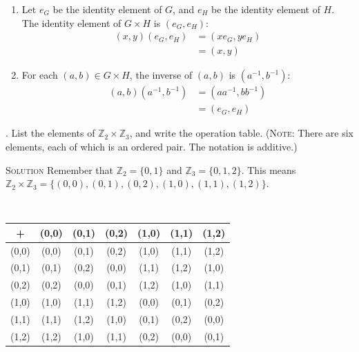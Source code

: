\documentclass[twoside]{amsart}
\newcommand{\Solution}{\textsc{Solution}\xspace}
\begin{document}
\begin{enumerate}[A.]
\begin{enumerate}[(a)]
\begin{enumerate}[(G1)]
	 \item Let $e_G$ be the identity element of $G$, and $e_H$
	 be the identity element of $H$. The identity element of
	 $G \times H$ is $(e_G,e_H)$:
	 \begin{align*}
	    (x,y)(e_G,e_H) & = (xe_G,ye_H)  \\
	                   & = (x,y)
	 \end{align*}

	 \item For each $(a,b)\in G \times H$, the inverse of $(a,b)$
	 is $(a^{-1},b^{-1})$:
	 \begin{align*}
	    (a,b)(a^{-1},b^{-1}) & = (aa^{-1},bb^{-1}) \\
	                         & = (e_G,e_H)
	 \end{align*}
      \end{enumerate}

      . List the elements of $\mathbb{Z}_2 \times \mathbb{Z}_3$,
      and write the operation table. (\textsc{Note}: There are six
      elements, each of which is an ordered pair. The notation is additive.)
      
      \Solution Remember that $\mathbb{Z}_2 = \{0,1\}$ and $\mathbb{Z}_3 =
      \{0,1,2\}$. This means $\mathbb{Z}_2 \times \mathbb{Z}_3 =
      \{(0,0), (0,1), (0,2), (1,0), (1,1), (1,2)\}$.

      \tiny \begin{verbatim}
      
      \end{verbatim}\normalsize
      \begin{center}
      \begin{tabular}{c|cccccc}
        +   & (0,0) & (0,1) & (0,2) & (1,0) & (1,1) & (1,2) \\ \hline
      (0,0) & (0,0) & (0,1) & (0,2) & (1,0) & (1,1) & (1,2) \\
      (0,1) & (0,1) & (0,2) & (0,0) & (1,1) & (1,2) & (1,0) \\
      (0,2) & (0,2) & (0,0) & (0,1) & (1,2) & (1,0) & (1,1) \\
      (1,0) & (1,0) & (1,1) & (1,2) & (0,0) & (0,1) & (0,2) \\
      (1,1) & (1,1) & (1,2) & (1,0) & (0,1) & (0,2) & (0,0) \\
      (1,2) & (1,2) & (1,0) & (1,1) & (0,2) & (0,0) & (0,1) 
      \end{tabular}
      \end{center}
      \tiny \begin{verbatim}
      

\end{verbatim}
\end{enumerate}
\end{enumerate}
\end{document}
